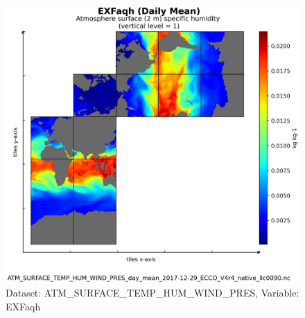 \begin{figure}[H]
\centering
\includegraphics[scale=0.55]{../images/plots/native_plots/Atmosphere_Surface_Temperature_Humidity_Wind_and_Pressure/EXFaqh.png}
\caption{Dataset: ATM\_SURFACE\_TEMP\_HUM\_WIND\_PRES, Variable: EXFaqh}
\label{tab:table-ATM_SURFACE_TEMP_HUM_WIND_PRES_EXFaqh-Plot}
\end{figure}
\newpage
\pagebreak
